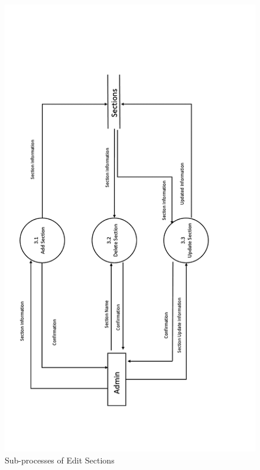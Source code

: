  \begin{figure}
 \centering
\includegraphics{figures/3final.png}
\caption{Sub-processes of Edit Sections}
\end{figure}



